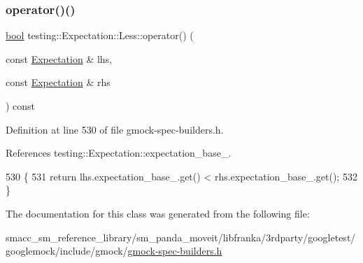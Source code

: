 \subsubsection{\texorpdfstring{operator()()}{operator()()}}
{\footnotesize\ttfamily \hyperlink{classbool}{bool} testing\+::\+Expectation\+::\+Less\+::operator() (\begin{DoxyParamCaption}\item[{const \hyperlink{classtesting_1_1Expectation}{Expectation} \&}]{lhs,  }\item[{const \hyperlink{classtesting_1_1Expectation}{Expectation} \&}]{rhs }\end{DoxyParamCaption}) const\hspace{0.3cm}{\ttfamily [inline]}}



Definition at line 530 of file gmock-\/spec-\/builders.\+h.



References testing\+::\+Expectation\+::expectation\+\_\+base\+\_\+.


\begin{DoxyCode}
530                                                                           \{
531       \textcolor{keywordflow}{return} lhs.expectation\_base\_.get() < rhs.expectation\_base\_.get();
532     \}
\end{DoxyCode}


The documentation for this class was generated from the following file\+:\begin{DoxyCompactItemize}
\item 
smacc\+\_\+sm\+\_\+reference\+\_\+library/sm\+\_\+panda\+\_\+moveit/libfranka/3rdparty/googletest/googlemock/include/gmock/\hyperlink{gmock-spec-builders_8h}{gmock-\/spec-\/builders.\+h}\end{DoxyCompactItemize}
